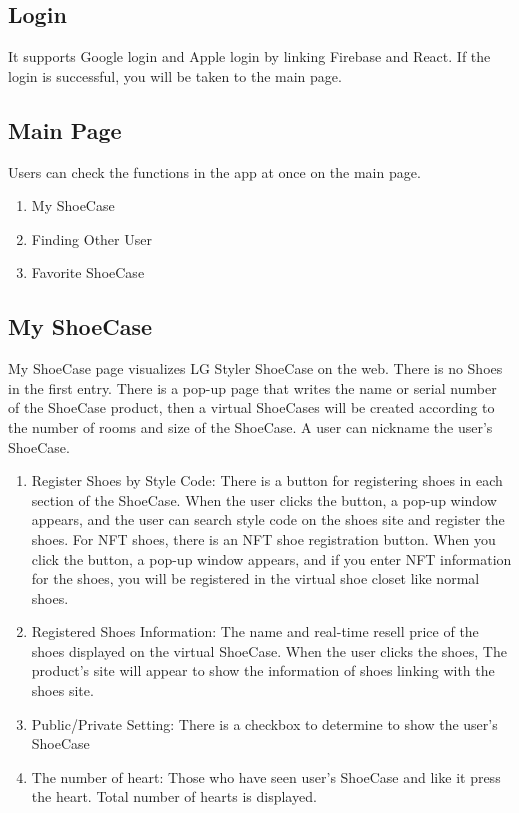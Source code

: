 \documentclass[conference]{IEEEtran}
\begin{document}
\subsection{Login}
It supports Google login and Apple login by linking Firebase and React. If the login is successful, you will be taken to the main page.\\

\subsection{Main Page}
Users can check the functions in the app at once on the main page. \\
\begin{enumerate}
    \item My ShoeCase\\
    \item Finding Other User\\
    \item Favorite ShoeCase\\
\end{enumerate}

\subsection{My ShoeCase}
My ShoeCase page visualizes LG Styler ShoeCase on the web. There is no Shoes in the first entry. There is a pop-up page that writes the name or serial number of the ShoeCase product, then a virtual ShoeCases will be created according to the number of rooms and size of the ShoeCase. A user can nickname the user's ShoeCase.
\\
\begin{enumerate}
    \item Register Shoes by Style Code: There is a button for registering shoes in each section of the ShoeCase. When the user clicks the button, a pop-up window appears, and the user can search style code on the shoes site and register the shoes. For NFT shoes, there is an NFT shoe registration button. When you click the button, a pop-up window appears, and if you enter NFT information for the shoes, you will be registered in the virtual shoe closet like normal shoes.
\\
    \item Registered Shoes Information: The name and real-time resell price of the shoes displayed on the virtual ShoeCase. When the user clicks the shoes, The product’s site will appear to show the information of shoes linking with the shoes site.
\\
    \item Public/Private Setting: There is a checkbox to determine to show the user's ShoeCase
\\
    \item The number of heart: Those who have seen user's ShoeCase and like it press the heart. Total number of hearts is displayed.
\\
\end{enumerate}
\end{document}
